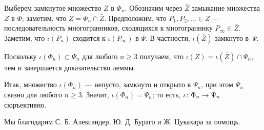 \documentclass[oneside,a4paper]{article}
\begin{document}
Выберем замкнутое множество $Z$ в $\Phi_n$.
Обозначим через $\bar Z$ замыкание множества $Z$ в $\Phi$; заметим, что $Z=\Phi_n\cap \bar Z$.
Предположим, что $P_1,P_2,\dots\in Z$ --- последовательность многогранников, сходящихся к многограннику $P_\infty\in\bar Z$.
Заметим, что $\iota(P_n)$ сходится к $\iota(P_\infty)$  в $\Psi$.
В частности, $\iota(\bar Z)$ замкнуто в~$\Psi$.

Поскольку $\iota(\Phi_n)\subset \Psi_n$ для любого $n\ge 3$ получаем, что  $\iota (Z)=\iota(\bar Z)\cap \Psi_n$, чем и завершается доказательство леммы. 

\medskip

Итак, множество $\iota(\Phi_n)$ --- непусто, замкнуто и открыто в $\Psi_n$, при этом $\Psi_n$ связно для любого $n\ge 3$.
Значит, $\iota(\Phi_n)=\Psi_n$; то есть, $\iota\:\Phi_n\z\to\Psi_n$ сюръективно.
\qeds

 Мы благодарим С. Б. Александер, Ю. Д. Бураго и Ж. Цукахара за помощь. 

\sloppy
\printbibliography[heading=bibintoc]
\fussy
\end{document}
